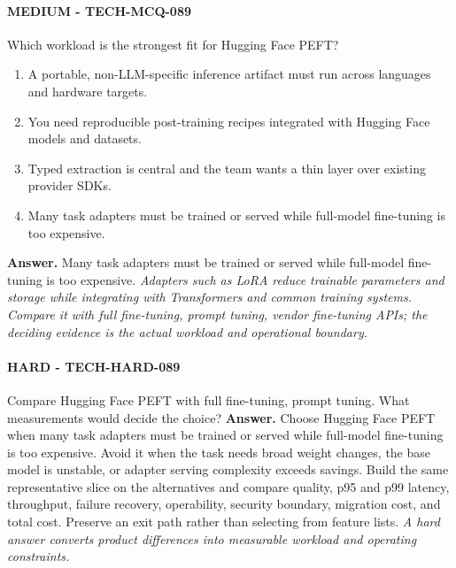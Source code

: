 \paragraph{MEDIUM - TECH-MCQ-089} Which workload is the strongest fit for Hugging Face PEFT?
\begin{enumerate}[label=\Alph*.]
\item A portable, non-LLM-specific inference artifact must run across languages and hardware targets.
\item You need reproducible post-training recipes integrated with Hugging Face models and datasets.
\item Typed extraction is central and the team wants a thin layer over existing provider SDKs.
\item Many task adapters must be trained or served while full-model fine-tuning is too expensive.
\end{enumerate}
\textbf{Answer.} Many task adapters must be trained or served while full-model fine-tuning is too expensive.
\textit{Adapters such as LoRA reduce trainable parameters and storage while integrating with Transformers and common training systems. Compare it with full fine-tuning, prompt tuning, vendor fine-tuning APIs; the deciding evidence is the actual workload and operational boundary.}
\paragraph{HARD - TECH-HARD-089} Compare Hugging Face PEFT with full fine-tuning, prompt tuning. What measurements would decide the choice?
\textbf{Answer.} Choose Hugging Face PEFT when many task adapters must be trained or served while full-model fine-tuning is too expensive. Avoid it when the task needs broad weight changes, the base model is unstable, or adapter serving complexity exceeds savings. Build the same representative slice on the alternatives and compare quality, p95 and p99 latency, throughput, failure recovery, operability, security boundary, migration cost, and total cost. Preserve an exit path rather than selecting from feature lists.
\textit{A hard answer converts product differences into measurable workload and operating constraints.}
